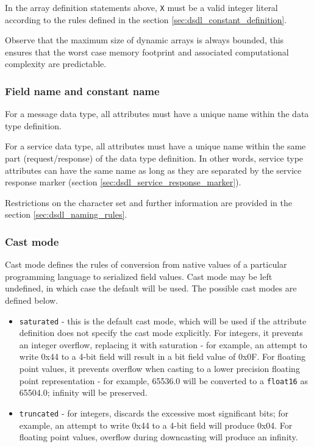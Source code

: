 In the array definition statements above, \verb|X| must be a valid
integer literal according to the rules defined in the section \ref{sec:dsdl_constant_definition}.

Observe that the maximum size of dynamic arrays is always bounded,
this ensures that the worst case memory footprint and associated computational complexity are predictable.

\subsubsection{Field name and constant name}

For a message data type, all attributes must have a unique name within the data type definition.

For a service data type, all attributes must have a unique name within the same part (request/response) of
the data type definition.
In other words, service type attributes can have the same name as long as they are separated by
the service response marker (section \ref{sec:dsdl_service_response_marker}).

Restrictions on the character set and further information are provided in the section \ref{sec:dsdl_naming_rules}.

\subsubsection{Cast mode}

Cast mode defines the rules of conversion from native values of a particular programming language
to serialized field values.
Cast mode may be left undefined, in which case the default will be used.
The possible cast modes are defined below.

\begin{itemize}
    \item \verb|saturated| - this is the default cast mode,
          which will be used if the attribute definition does not specify the cast mode explicitly.
          For integers, it prevents an integer overflow, replacing it with saturation -
          for example, an attempt to write 0x44 to a 4-bit field
          will result in a bit field value of 0x0F.
          For floating point values, it prevents overflow when casting to a lower precision floating point
          representation - for example, 65536.0 will be converted to a \verb|float16| as 65504.0;
          infinity will be preserved.
    \item \verb|truncated| - for integers, discards the excessive most significant bits;
          for example, an attempt to write 0x44 to a 4-bit field will produce 0x04.
          For floating point values, overflow during downcasting will produce an infinity.
\end{itemize}

